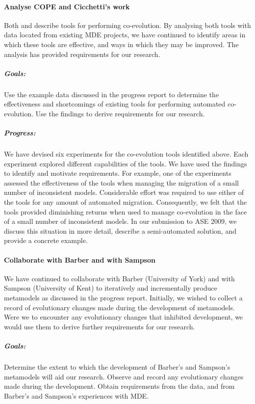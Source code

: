 \paragraph{Analyse COPE and Cicchetti's work} %
\label{par:analyse_existing_work}
Both \cite{herrmannsdoerfer08cope} and \cite{cicchetti08automating} describe tools for performing co-evolution. By analysing both tools with data located from existing MDE projects, we have continued to identify areas in which these tools are effective, and ways in which they may be improved. The analysis has provided requirements for our research.

\subparagraph{Goals:} Use the example data discussed in the progress report to determine the effectiveness and shortcomings of existing tools for performing automated co-evolution. Use the findings to derive requirements for our research.

\subparagraph{Progress:} We have devised six experiments for the co-evolution tools identified above. Each experiment explored different capabilities of the tools. We have used the findings to identify and motivate requirements. For example, one of the experiments assessed the effectiveness of the tools when managing the migration of a small number of inconsistent models. Considerable effort was required to use either of the tools for any amount of automated migration. Consequently, we felt that the tools provided diminishing returns when used to manage co-evolution in the face of a small number of inconsistent models. In our submission to ASE 2009, we discuss this situation in more detail, describe a semi-automated solution, and provide a concrete example.



\paragraph{Collaborate with Barber and with Sampson} %
\label{par:collaborate_with_barber_and_with_sampson}
We have continued to collaborate with Barber (University of York) and with Sampson (University of Kent) to iteratively and incrementally produce metamodels as discussed in the progress report. Initially, we wished to collect a record of evolutionary changes made during the development of metamodels. Were we to encounter any evolutionary changes that inhibited development, we would use them to derive further requirements for our research.

\subparagraph{Goals:} Determine the extent to which the development of Barber's and Sampson's metamodels will aid our research. Observe and record any evolutionary changes made during the development. Obtain requirements from the data, and from Barber's and Sampson's experiences with MDE.

